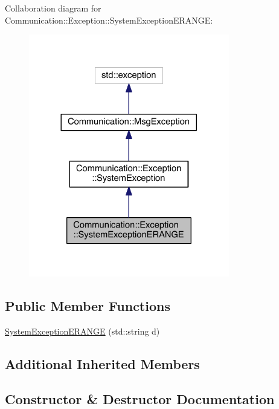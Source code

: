Collaboration diagram for Communication\+:\+:Exception\+:\+:System\+Exception\+E\+R\+A\+N\+G\+E\+:\nopagebreak
\begin{figure}[H]
\begin{center}
\leavevmode
\includegraphics[width=248pt]{class_communication_1_1_exception_1_1_system_exception_e_r_a_n_g_e__coll__graph}
\end{center}
\end{figure}
\subsection*{Public Member Functions}
\begin{DoxyCompactItemize}
\item 
\hyperlink{class_communication_1_1_exception_1_1_system_exception_e_r_a_n_g_e_ae3e7dd3e3964ef74d2d3f8dea59042b3}{System\+Exception\+E\+R\+A\+N\+G\+E} (std\+::string d)
\end{DoxyCompactItemize}
\subsection*{Additional Inherited Members}


\subsection{Constructor \& Destructor Documentation}
\hypertarget{class_communication_1_1_exception_1_1_system_exception_e_r_a_n_g_e_ae3e7dd3e3964ef74d2d3f8dea59042b3}{}
